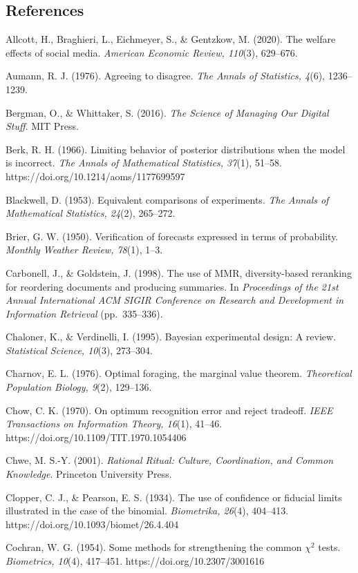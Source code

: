 \documentclass[
  11pt]{article}
\begin{document}
\subsection{References}\label{references}

Allcott, H., Braghieri, L., Eichmeyer, S., \& Gentzkow, M. (2020). The
welfare effects of social media. \emph{American Economic Review,
110}(3), 629--676.

Aumann, R. J. (1976). Agreeing to disagree. \emph{The Annals of
Statistics, 4}(6), 1236--1239.

Bergman, O., \& Whittaker, S. (2016). \emph{The Science of Managing Our
Digital Stuff}. MIT Press.

Berk, R. H. (1966). Limiting behavior of posterior distributions when
the model is incorrect. \emph{The Annals of Mathematical Statistics,
37}(1), 51--58. https://doi.org/10.1214/aoms/1177699597

Blackwell, D. (1953). Equivalent comparisons of experiments. \emph{The
Annals of Mathematical Statistics, 24}(2), 265--272.

Brier, G. W. (1950). Verification of forecasts expressed in terms of
probability. \emph{Monthly Weather Review, 78}(1), 1--3.

Carbonell, J., \& Goldstein, J. (1998). The use of MMR, diversity-based
reranking for reordering documents and producing summaries. In
\emph{Proceedings of the 21st Annual International ACM SIGIR Conference
on Research and Development in Information Retrieval} (pp.~335--336).

Chaloner, K., \& Verdinelli, I. (1995). Bayesian experimental design: A
review. \emph{Statistical Science, 10}(3), 273--304.

Charnov, E. L. (1976). Optimal foraging, the marginal value theorem.
\emph{Theoretical Population Biology, 9}(2), 129--136.

Chow, C. K. (1970). On optimum recognition error and reject tradeoff.
\emph{IEEE Transactions on Information Theory, 16}(1), 41--46.
https://doi.org/10.1109/TIT.1970.1054406

Chwe, M. S.-Y. (2001). \emph{Rational Ritual: Culture, Coordination, and
Common Knowledge}. Princeton University Press.

Clopper, C. J., \& Pearson, E. S. (1934). The use of confidence or
fiducial limits illustrated in the case of the binomial.
\emph{Biometrika, 26}(4), 404--413.
https://doi.org/10.1093/biomet/26.4.404

Cochran, W. G. (1954). Some methods for strengthening the common
\(\chi^2\) tests. \emph{Biometrics, 10}(4), 417--451.
https://doi.org/10.2307/3001616
\end{document}

